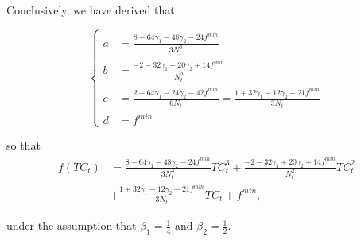 \documentclass[12pt]{article}
\begin{document}
\begin{appendices}
		\noindent Conclusively, we have derived that
		
        \begin{equation} \label{eq:cubic_a_b_c}
		    \begin{cases}
		        a &= \frac{8 + 64\gamma_1 - 48\gamma_2 -24f^{min}}{3N_t^3} \\
		        b &= \frac{-2 - 32\gamma_1 + 20\gamma_2 + 14f^{min}}{N_t^2} \\
		        c &= \frac{2 + 64\gamma_1 - 24\gamma_2 - 42f^{min}}{6N_t} = \frac{1 + 32\gamma_1 - 12\gamma_2 - 21f^{min}}{3N_t} \\
		        d &= f^{min}
		    \end{cases}
		\end{equation}
		
		\noindent so that
		\begin{align*}
		f(TC_t) &= \frac{8 + 64\gamma_1 - 48\gamma_2 -24f^{min}}{3N_t^3}TC_t^3 + \frac{-2 - 32\gamma_1 + 20\gamma_2 + 14f^{min}}{N_t^2}TC_t^2 \\
		&+ \frac{1 + 32\gamma_1 - 12\gamma_2 - 21f^{min}}{3N_t}TC_t + f^{min},
		\end{align*}
		
		\noindent under the assumption that $\beta_1 = \frac{1}{4}$ and $\beta_2 = \frac{1}{2}$.
	
	\end{appendices}
	
\end{document}
